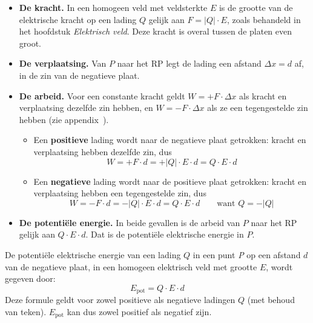 \documentclass{ximera}
\begin{document}
\begin{itemize}
    \item[\textbf{Stap 1.}] \textbf{De kracht.} In een homogeen veld met veldsterkte $E$ is de grootte van de elektrische kracht op een lading $Q$ gelijk aan $F = \lvert Q \rvert \cdot E$, zoals behandeld in het hoofdstuk \textit{Elektrisch veld}. Deze kracht is overal tussen de platen even groot.
    \item[\textbf{Stap 2.}] \textbf{De verplaatsing.} Van $P$ naar het RP legt de lading een afstand $\Delta x = d$ af, in de zin van de negatieve plaat.
    \item[\textbf{Stap 3.}] \textbf{De arbeid.} Voor een constante kracht geldt $W = +F \cdot \Delta x$ als kracht en verplaatsing dezelfde zin hebben, en $W = -F \cdot \Delta x$ als ze een tegengestelde zin hebben (zie appendix~).
    \begin{itemize}
        \item Een \textbf{positieve} lading wordt naar de negatieve plaat getrokken: kracht en verplaatsing hebben dezelfde zin, dus
        \[
            W = +F \cdot d = +\lvert Q \rvert \cdot E \cdot d = Q \cdot E \cdot d
        \]
        \item Een \textbf{negatieve} lading wordt naar de positieve plaat getrokken: kracht en verplaatsing hebben een tegengestelde zin, dus
        \[
            W = -F \cdot d = -\lvert Q \rvert \cdot E \cdot d = Q \cdot E \cdot d \qquad \text{want } Q = -\lvert Q \rvert
        \]
    \end{itemize}
    \item[\textbf{Stap 4.}] \textbf{De potentiële energie.} In beide gevallen is de arbeid van $P$ naar het RP gelijk aan $Q \cdot E \cdot d$. Dat is de potentiële elektrische energie in $P$.
\end{itemize}

\begin{proposition}[foldable=true,title={Potentiële elektrische energie in een homogeen veld}]\nl
    De potentiële elektrische energie van een lading $Q$ in een punt \textit{P} op een afstand $d$ van de negatieve plaat, in een homogeen elektrisch veld met grootte $E$, wordt gegeven door:
    \begin{equation}\label{eq:epot_homogeen}
        E_{\text{pot}} = Q \cdot E \cdot d
    \end{equation}
    Deze formule geldt voor zowel positieve als negatieve ladingen $Q$ (met behoud van teken). $E_{\text{pot}}$ kan dus zowel positief als negatief zijn.
\end{proposition}
\end{document}
